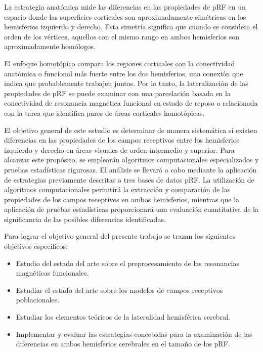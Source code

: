 La estrategia anatómica mide las diferencias en las propiedades de pRF en un espacio donde las superficies corticales son aproximadamente simétricas en los hemisferios izquierdo y derecho. Esta simetría significa que cuando se considera el orden de los vértices, aquellos con el mismo rango en ambos hemisferios son aproximadamente homólogos.

El enfoque homotópico compara los regiones corticales con la conectividad anatómica o funcional más fuerte entre los dos hemisferios, una conexión que indica que probablemente trabajen juntos. Por lo tanto, la lateralización de las propiedades de pRF se puede examinar con una parcelación basada en la conectividad de resonancia magnética funcional en estado de reposo o relacionada con la tarea que identifica pares de áreas corticales homotópicas.  

El objetivo general de este estudio es determinar de manera sistemática si existen diferencias en las propiedades de los campos receptivos entre los hemisferios izquierdo y derecho en áreas visuales de orden intermedio y superior. Para alcanzar este propósito, se emplearán algoritmos computacionales especializados y pruebas estadísticas rigurosas. El análisis se llevará a cabo mediante la aplicación de estrategias previamente descritas a tres bases de datos pRF. La utilización de algoritmos computacionales permitirá la extracción y comparación de las propiedades de los campos receptivos en ambos hemisferios, mientras que la aplicación de pruebas estadísticas proporcionará una evaluación cuantitativa de la significancia de las posibles diferencias identificadas.

Para lograr el objetivo general del presente trabajo se
trazan los siguientes objetivos específicos:

\begin{itemize}
	\item Estudio del estado del arte sobre el preprocesamiento de las resonancias magn\'eticas funcionales.
	\item Estudiar el estado del arte sobre los modelos de campos receptivos poblacionales.
	\item Estudiar los elementos te\'oricos de la lateralidad hemisf\'erica cerebral.
	\item Implementar y evaluar las estrategias concebidas para la examinaci\'on de las diferencias en ambos hemisferios cerebrales en el tama\~no de los pRF.
	
\end{itemize}

